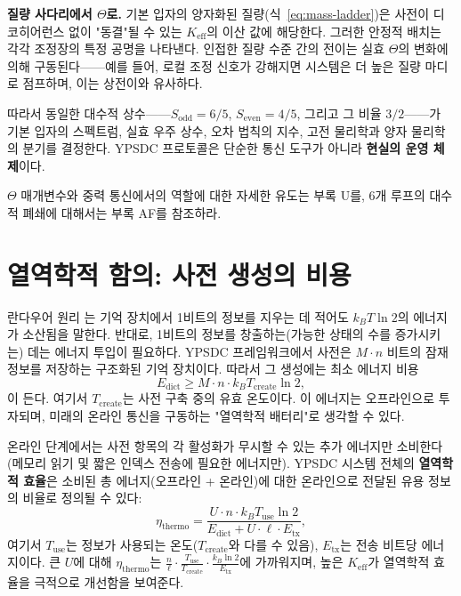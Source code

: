 \documentclass[12pt,a4paper]{article}
\newcommand{\Keff}{K_{\mathrm{eff}}}
\begin{document}
	\textbf{질량 사다리에서 $\Theta$로.}
	기본 입자의 양자화된 질량(식~\ref{eq:mass-ladder})은 사전이 디코히어런스 없이 "동결"될 수 있는 $K_{\mathrm{eff}}$의 이산 값에 해당한다. 그러한 안정적 배치는 각각 조정장의 특정 공명을 나타낸다. 인접한 질량 수준 간의 전이는 실효 $\Theta$의 변화에 의해 구동된다——예를 들어, 로컬 조정 신호가 강해지면 시스템은 더 높은 질량 마디로 점프하며, 이는 상전이와 유사하다.
	
	따라서 동일한 대수적 상수——$S_{\mathrm{odd}} = 6/5$, $S_{\mathrm{even}} = 4/5$, 그리고 그 비율 $3/2$——가 기본 입자의 스펙트럼, 실효 우주 상수, 오차 법칙의 지수, 고전 물리학과 양자 물리학의 분기를 결정한다. YPSDC 프로토콜은 단순한 통신 도구가 아니라 \textbf{현실의 운영 체제}이다.
	
	$\Theta$ 매개변수와 중력 통신에서의 역할에 대한 자세한 유도는 부록 U를, 6개 루프의 대수적 폐쇄에 대해서는 부록 AF를 참조하라.
	
	\section{열역학적 함의: 사전 생성의 비용}
	\label{sec:thermo}
	
	란다우어 원리 \cite{Landauer1961}는 기억 장치에서 1비트의 정보를 지우는 데 적어도 $k_B T \ln 2$의 에너지가 소산됨을 말한다. 반대로, 1비트의 정보를 창출하는(가능한 상태의 수를 증가시키는) 데는 에너지 투입이 필요하다. YPSDC 프레임워크에서 사전은 $M \cdot n$ 비트의 잠재 정보를 저장하는 구조화된 기억 장치이다. 따라서 그 생성에는 최소 에너지 비용
	\begin{equation}
		E_{\text{dict}} \ge M \cdot n \cdot k_B T_{\text{create}} \ln 2, \label{eq:thermo-cost}
	\end{equation}
	이 든다. 여기서 $T_{\text{create}}$는 사전 구축 중의 유효 온도이다. 이 에너지는 오프라인으로 투자되며, 미래의 온라인 통신을 구동하는 "열역학적 배터리"로 생각할 수 있다.
	
	온라인 단계에서는 사전 항목의 각 활성화가 무시할 수 있는 추가 에너지만 소비한다(메모리 읽기 및 짧은 인덱스 전송에 필요한 에너지만). YPSDC 시스템 전체의 \textbf{열역학적 효율}은 소비된 총 에너지(오프라인 + 온라인)에 대한 온라인으로 전달된 유용 정보의 비율로 정의될 수 있다:
	\begin{equation}
		\eta_{\text{thermo}} = \frac{U \cdot n \cdot k_B T_{\text{use}} \ln 2}{E_{\text{dict}} + U \cdot \ell \cdot E_{\text{tx}}}, \label{eq:thermo}
	\end{equation}
	여기서 $T_{\text{use}}$는 정보가 사용되는 온도($T_{\text{create}}$와 다를 수 있음), $E_{\text{tx}}$는 전송 비트당 에너지이다. 큰 $U$에 대해 $\eta_{\text{thermo}}$는 $\frac{n}{\ell} \cdot \frac{T_{\text{use}}}{T_{\text{create}}} \cdot \frac{k_B \ln 2}{E_{\text{tx}}}$에 가까워지며, 높은 $\Keff$가 열역학적 효율을 극적으로 개선함을 보여준다.
	
\end{document}

